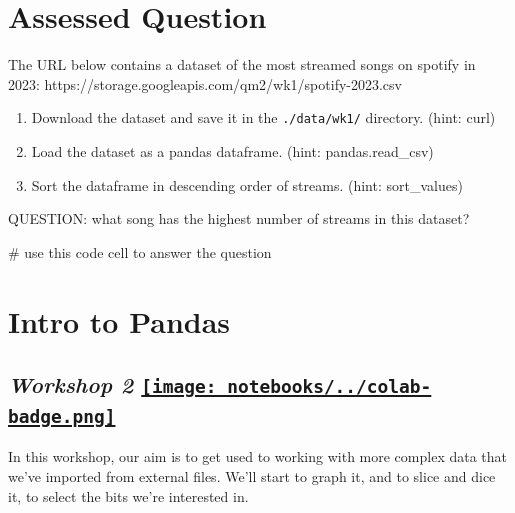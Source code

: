\documentclass[
  letterpaper,
  DIV=11,
  numbers=noendperiod]{scrreprt}
\newenvironment{Shaded}{\begin{snugshade}}{\end{snugshade}}
\newcommand{\CommentTok}[1]{\textcolor[rgb]{0.37,0.37,0.37}{#1}}
\providecommand{\tightlist}{%
  \setlength{\itemsep}{0pt}\setlength{\parskip}{0pt}}\usepackage{longtable,booktabs,array}
\begin{document}

\hypertarget{assessed-question}{%
\chapter{Assessed Question}\label{assessed-question}}

The URL below contains a dataset of the most streamed songs on spotify
in 2023: https://storage.googleapis.com/qm2/wk1/spotify-2023.csv

\begin{enumerate}
\def\labelenumi{\arabic{enumi}.}
\tightlist
\item
  Download the dataset and save it in the \texttt{./data/wk1/}
  directory. (hint: curl)
\item
  Load the dataset as a pandas dataframe. (hint: pandas.read\_csv)
\item
  Sort the dataframe in descending order of streams. (hint:
  sort\_values)
\end{enumerate}

QUESTION: what song has the highest number of streams in this dataset?

\begin{Shaded}
\begin{Highlighting}[]
\CommentTok{\# use this code cell to answer the question}
\end{Highlighting}
\end{Shaded}


\hypertarget{intro-to-pandas}{%
\chapter{Intro to Pandas}\label{intro-to-pandas}}

\hypertarget{workshop-2-open-in-colab}{%
\section[\emph{Workshop 2} ]{\texorpdfstring{\emph{Workshop 2}
\href{https://colab.research.google.com/github/oballinger/QM2/blob/main/notebooks/W02.\%20Pandas.ipynb}{\protect\texttt{[image: notebooks/../colab-badge.png]}}}{Workshop 2 Open In Colab}}\label{workshop-2-open-in-colab}}

In this workshop, our aim is to get used to working with more complex
data that we've imported from external files. We'll start to graph it,
and to slice and dice it, to select the bits we're interested in.
\end{document}
